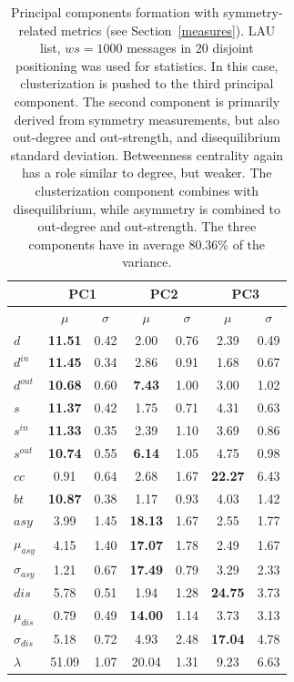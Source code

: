 \documentclass[%
 aip,
 jmp,%
 amsmath,amssymb,
 reprint,%
]{revtex4-1}
\begin{document}
\begin{table}
  \centering
  \caption{Principal components formation with symmetry-related metrics (see Section~\ref{measures}). LAU list, $ws=1000$ messages in 20 disjoint positioning was used for statistics. In this case, clusterization is pushed to the third principal component. The second component is primarily derived from symmetry measurements, but also out-degree and out-strength, and disequilibrium standard deviation. Betweenness centrality again has a role similar to degree, but weaker. The clusterization component combines with disequilibrium, while asymmetry is combined to out-degree and out-strength. The three components have in average 80.36\% of the variance.}
  \begin{tabular}{|l|c|c| c|c| c|c|}\hline
 & \multicolumn{2}{c|}{PC1} & \multicolumn{2}{c|}{PC2} & \multicolumn{2}{c|}{PC3}  \\\hline
       & $\mu$ & $\sigma$ & $\mu$ & $\sigma$ & $\mu$ & $\sigma$  \\\hline
$d$            & {\bf 11.51} & 0.42 & 2.00  & 0.76 & 2.39  & 0.49 \\ 
$d^{in}$       & {\bf 11.45} & 0.34 & 2.86  & 0.91 & 1.68  & 0.67 \\
$d^{out}$      & {\bf 10.68} & 0.60 & {\bf 7.43}  & 1.00 & 3.00  & 1.02 \\
$s$            & {\bf 11.37} & 0.42 & 1.75  & 0.71 & 4.31  & 0.63 \\ 
$s^{in}$       & {\bf 11.33} & 0.35 & 2.39  & 1.10 & 3.69  & 0.86 \\ 
$s^{out}$      & {\bf 10.74} & 0.55 & {\bf 6.14}  & 1.05 & 4.75  & 0.98 \\ \hline
$cc$           & 0.91        & 0.64 & 2.68  & 1.67 & {\bf 22.27} & 6.43 \\ 
$bt$           & {\bf 10.87} & 0.38 & 1.17  & 0.93 & 4.03  & 1.42 \\ \hline
$asy$          & 3.99        & 1.45 & {\bf 18.13} & 1.67 & 2.55  & 1.77 \\
$\mu_{asy}$    & 4.15        & 1.40 & {\bf 17.07} & 1.78 & 2.49  & 1.67 \\
$\sigma_{asy}$ & 1.21        & 0.67 & {\bf 17.49} & 0.79 & 3.29  & 2.33 \\
$dis$          & 5.78        & 0.51 & 1.94  & 1.28 & {\bf 24.75} & 3.73 \\
$\mu_{dis}$    & 0.79        & 0.49 & {\bf 14.00} & 1.14 & 3.73  & 3.13 \\
$\sigma_{dis}$ & 5.18        & 0.72 & 4.93  & 2.48 & {\bf 17.04} & 4.78 \\ \hline
$\lambda$      & 51.09       & 1.07 & 20.04 & 1.31 & 9.23  & 6.63 \\ \hline
  \end{tabular}
  \label{compPCA2}
\end{table}
\end{document}
